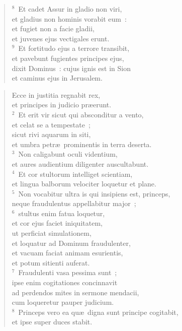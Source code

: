\begin{flushleft}
\begin{verse}
${}^{8}$~Et cadet Assur in gladio non viri,\\ et gladius non hominis vorabit eum~:\\ et fugiet non a facie gladii,\\ et juvenes ejus vectigales erunt.\\
${}^{9}$~Et fortitudo ejus a terrore transibit,\\ et pavebunt fugientes principes ejus,\\ dixit Dominus~: cujus ignis est in Sion\\ et caminus ejus in Jerusalem.\end{verse}\end{flushleft}


\begin{flushleft}\begin{verse}\vspace{-19pt}\hspace{6pt}Ecce in justitia regnabit rex,\\\hspace{6pt} et principes in judicio pr\ae erunt.\\
${}^{2}$~Et erit vir sicut qui absconditur a vento,\\ et celat se a tempestate~;\\ sicut rivi aquarum in siti,\\ et umbra petr\ae\ prominentis in terra deserta.\\
${}^{3}$~Non caligabunt oculi videntium,\\ et aures audientium diligenter auscultabunt.\\
${}^{4}$~Et cor stultorum intelliget scientiam,\\ et lingua balborum velociter loquetur et plane.\\
${}^{5}$~Non vocabitur ultra is qui insipiens est, princeps,\\ neque fraudulentus appellabitur major~;\\
${}^{6}$~stultus enim fatua loquetur,\\ et cor ejus faciet iniquitatem,\\ ut perficiat simulationem,\\ et loquatur ad Dominum fraudulenter,\\ et vacuam faciat animam esurientis,\\ et potum sitienti auferat.\\
${}^{7}$~Fraudulenti vasa pessima sunt~;\\ ipse enim cogitationes concinnavit\\ ad perdendos mites in sermone mendacii,\\ cum loqueretur pauper judicium.\\
${}^{8}$~Princeps vero ea qu\ae\ digna sunt principe cogitabit,\\ et ipse super duces stabit.\end{verse}\end{flushleft}


